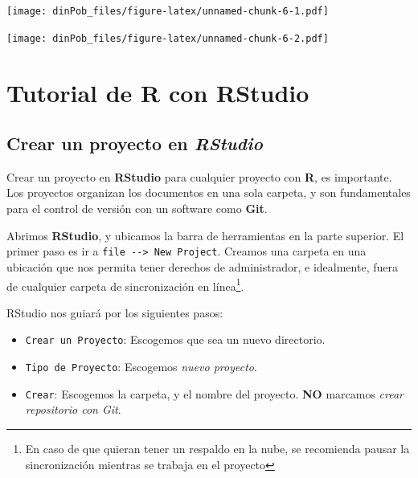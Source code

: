 \documentclass[12pt,letterpaper,]{book}
\newenvironment{Shaded}{\begin{snugshade}}{\end{snugshade}}
\newcommand{\KeywordTok}[1]{\textcolor[rgb]{0.13,0.29,0.53}{\textbf{#1}}}
\newcommand{\DataTypeTok}[1]{\textcolor[rgb]{0.13,0.29,0.53}{#1}}
\newcommand{\StringTok}[1]{\textcolor[rgb]{0.31,0.60,0.02}{#1}}
\newcommand{\OperatorTok}[1]{\textcolor[rgb]{0.81,0.36,0.00}{\textbf{#1}}}
\newcommand{\NormalTok}[1]{#1}
\let\rmarkdownfootnote\footnote%
\def\footnote{\protect\rmarkdownfootnote}
\begin{document}
\texttt{[image: dinPob\_files/figure-latex/unnamed-chunk-6-1.pdf]}

\begin{Shaded}
\end{Shaded}

\texttt{[image: dinPob\_files/figure-latex/unnamed-chunk-6-2.pdf]}

\chapter{Tutorial de R con RStudio}\label{tutorial-de-r-con-rstudio}

\section{\texorpdfstring{Crear un proyecto en
\emph{RStudio}}{Crear un proyecto en RStudio}}\label{RStudioProject}

Crear un proyecto en \textbf{RStudio} para cualquier proyecto con
\textbf{R}, es importante. Los proyectos organizan los documentos en una
sola carpeta, y son fundamentales para el control de versión con un
software como \textbf{Git}.

Abrimos \textbf{RStudio}, y ubicamos la barra de herramientas en la
parte superior. El primer paso es ir a
\texttt{file\ -\/-\textgreater{}\ New\ Project}. Creamos una carpeta en
una ubicación que nos permita tener derechos de administrador, e
idealmente, fuera de cualquier carpeta de sincronización en
línea\footnote{En caso de que quieran tener un respaldo en la nube, se recomienda pausar la sincronización mientras se trabaja en el proyecto}.

RStudio nos guiará por los siguientes pasos:

\begin{itemize}
\item
  \texttt{Crear\ un\ Proyecto}: Escogemos que sea un nuevo directorio.
\item
  \texttt{Tipo\ de\ Proyecto}: Escogemos \emph{nuevo proyecto}.
\item
  \texttt{Crear}: Escogemos la carpeta, y el nombre del proyecto.
  \textbf{NO} marcamos \emph{crear repositorio con Git}.
\end{itemize}
\end{document}
